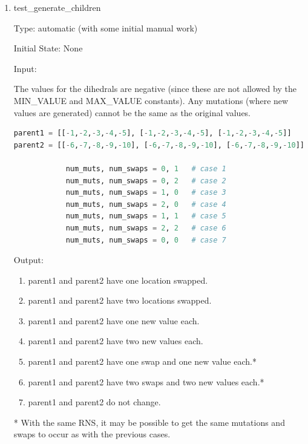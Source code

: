 \documentclass[12pt, titlepage]{article}
\begin{document}
\begin{enumerate}
	
\item{test\_generate\_children\\}

Type: automatic (with some initial manual work)

Initial State: None 

Input: 

The values for the dihedrals are negative (since these are not allowed by the 
MIN\_VALUE and MAX\_VALUE constants). Any mutations (where new values are 
generated) cannot be the same as the original values.

\begin{adjustwidth}{-1in}{-1in}
\begin{center}
\begin{lstlisting}[language=python, showstringspaces=false]
parent1 = [[-1,-2,-3,-4,-5], [-1,-2,-3,-4,-5], [-1,-2,-3,-4,-5]]
parent2 = [[-6,-7,-8,-9,-10], [-6,-7,-8,-9,-10], [-6,-7,-8,-9,-10]]

            num_muts, num_swaps = 0, 1   # case 1
            num_muts, num_swaps = 0, 2   # case 2
            num_muts, num_swaps = 1, 0   # case 3
            num_muts, num_swaps = 2, 0   # case 4
            num_muts, num_swaps = 1, 1   # case 5
            num_muts, num_swaps = 2, 2   # case 6
            num_muts, num_swaps = 0, 0   # case 7
\end{lstlisting}
\end{center}
\end{adjustwidth}


Output:

\begin{enumerate}[label=Case \arabic*:]
	\item parent1 and parent2 have one location swapped.
	\item parent1 and parent2 have two locations swapped.
	\item parent1 and parent2 have one new value each.
	\item parent1 and parent2 have two new values each.
	\item parent1 and parent2 have one swap and one new value each.*
	\item parent1 and parent2 have two swaps and two new values each.*
	\item parent1 and parent2 do not change.
\end{enumerate}

* With the same RNS, it may be possible to get the same mutations and swaps to 
occur as with the previous cases.


\end{enumerate}
\end{document}
